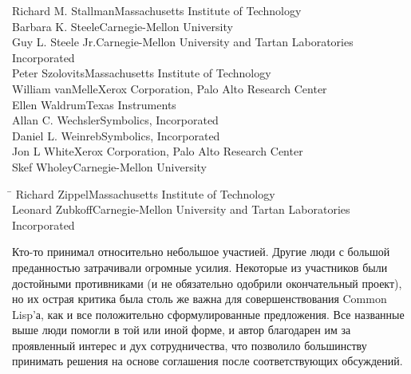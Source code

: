 \begin{tabbing}
Richard M. Stallman\>Massachusetts Institute of Technology \\
Barbara K. Steele\>Carnegie-Mellon University \\
Guy L. Steele Jr.\>Carnegie-Mellon University and Tartan Laboratories \\
                 \>Incorporated \\
Peter Szolovits\>Massachusetts Institute of Technology \\
William vanMelle\>Xerox Corporation, Palo Alto Research Center \\ Ellen
Waldrum\>Texas Instruments \\ Allan C. Wechsler\>Symbolics, Incorporated \\
Daniel L. Weinreb\>Symbolics, Incorporated \\
Jon L White\>Xerox Corporation, Palo Alto Research Center \\
Skef Wholey\>Carnegie-Mellon University
\end{tabbing}
\begin{tabbing}
\hskip8.5pc\=\kill
Richard Zippel\>Massachusetts Institute of Technology \\
Leonard Zubkoff\>Carnegie-Mellon University and Tartan Laboratories \\
               \>Incorporated
\end{tabbing}
Кто-то принимал относительно небольшое участией. Другие люди с большой
преданностью затрачивали огромные усилия. Некоторые из участников были
достойными противниками (и не обязательно одобрили окончательный проект), но их
острая критика была столь же важна для совершенствования Common Lisp'а, как и
все положительно сформулированные предложения. Все названные выше люди
помогли в той или иной форме, и автор благодарен им за проявленный интерес и дух
сотрудничества, что позволило большинству принимать решения на основе соглашения
после соответствующих обсуждений.

